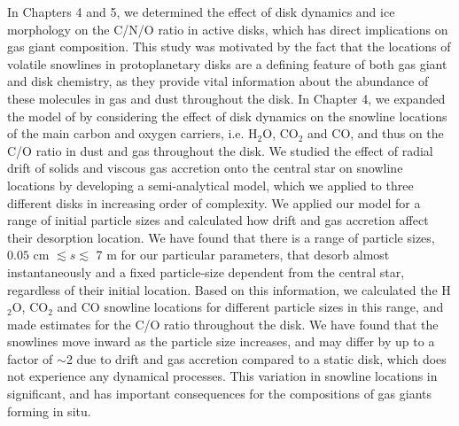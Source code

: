 In Chapters 4 and 5, we determined the effect of disk dynamics and ice morphology on the C/N/O ratio in active disks, which has direct implications on gas giant composition. This study was motivated by the fact that the locations of volatile snowlines in protoplanetary disks are a defining feature of both gas giant and disk chemistry, as they provide vital information about the abundance of these molecules in gas and dust throughout the disk. In Chapter 4, we expanded the model of \citet{oberg11} by considering the effect of disk dynamics on the snowline locations of the main carbon and oxygen carriers, i.e. H$_2$O, CO$_2$ and CO, and thus on the C/O ratio in dust and gas throughout the disk. We studied the effect of radial drift of solids and viscous gas accretion onto the central star on snowline locations by developing a semi-analytical model, which we applied to three different disks in increasing order of complexity. We applied our model for a range of initial particle sizes and calculated how drift and gas accretion affect their desorption location. We have found that there is a range of particle sizes, $0.05$ cm $\lesssim s \lesssim$ 7 m for our particular parameters, that desorb almost instantaneously and a fixed particle-size dependent from the central star, regardless of their initial location. Based on this information, we calculated the H$_2$O, CO$_2$ and CO snowline locations for different particle sizes in this range, and made estimates for the C/O ratio throughout the disk. We have found that the snowlines move inward as the particle size increases, and may differ by up to a factor of $\sim$2 due to drift and gas accretion compared to a static disk, which does not experience any dynamical processes. This variation in snowline locations in significant, and has important consequences for the compositions of gas giants forming in situ. 

